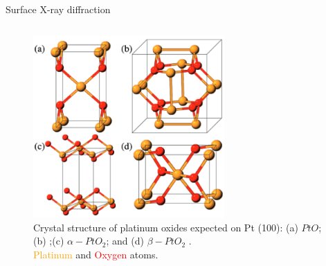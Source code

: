 \begin{frame}{Surface X-ray diffraction}
\begin{columns}
        \pause
        \begin{figure}
            \centering
            \includegraphics[width=0.65\textwidth]{Figures/sxrd_data/PtOxides.png}
            \caption{Crystal  structure  of  platinum  oxides expected on Pt (100): (a) $PtO$; (b) \ptthreeofour;(c) $\alpha-PtO_2$; and (d) $\beta-PtO_2$ \footnotemark{}.\\ \textcolor{orange}{Platinum} and \textcolor{red}{Oxygen} atoms.}
            \label{fig:PtOstructures}
        \end{figure}


    \end{columns}
    
\end{frame}